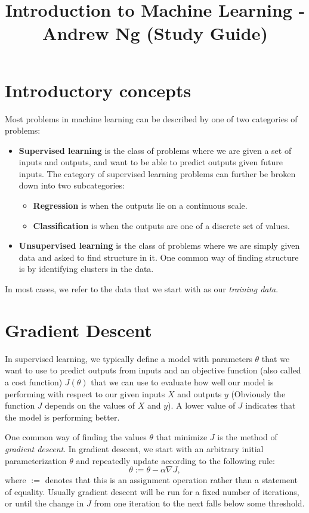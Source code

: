 \documentclass{article}
\title{Introduction to Machine Learning - Andrew Ng (Study Guide)}
\begin{document}
\maketitle

\section{Introductory concepts}\label{intro}
Most problems in machine learning can be described by one of two categories of problems:
\begin{itemize}
\item \textbf{Supervised learning} is the class of problems where we are given a set of inputs and outputs, and want to be able to predict outputs given future inputs. The category of supervised learning problems can further be broken down into two subcategories: 
\begin{itemize}
\item \textbf{Regression} is when the outputs lie on a continuous scale.
\item \textbf{Classification} is when the outputs are one of a discrete set of values.
\end{itemize}
\item \textbf{Unsupervised learning} is the class of problems where we are simply given data and asked to find structure in it. One common way of finding structure is by identifying clusters in the data.
\end{itemize}
In most cases, we refer to the data that we start with as our \emph{training data}.

\section{Gradient Descent}\label{graddesc}
In supervised learning, we typically define a model with parameters $\theta$ that we want to use to predict outputs from inputs and an objective function (also called a cost function) $J({\theta})$ that we can use to evaluate how well our model is performing with respect to our given inputs $X$ and outputs $y$ (Obviously the function $J$ depends on the values of $X$ and $y$). A lower value of $J$ indicates that the model is performing better.

One common way of finding the values $\theta$ that minimize $J$ is the method of \emph{gradient descent}. In gradient descent, we start with an arbitrary initial parameterization $\theta$ and repeatedly update according to the following rule:
$$\theta := \theta - \alpha \nabla J,$$
where $:=$ denotes that this is an assignment operation rather than a statement of equality. Usually gradient descent will be run for a fixed number of iterations, or until the change in $J$ from one iteration to the next falls below some threshold. 
\end{document}
